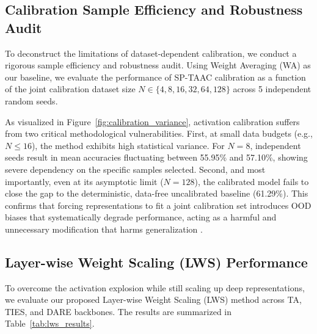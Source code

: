 \documentclass{article}
\theoremstyle{plain}
\theoremstyle{definition}
\theoremstyle{remark}
\begin{document}
\subsection{Calibration Sample Efficiency and Robustness Audit}
To deconstruct the limitations of dataset-dependent calibration, we conduct a rigorous sample efficiency and robustness audit. Using Weight Averaging (WA) as our baseline, we evaluate the performance of SP-TAAC calibration as a function of the joint calibration dataset size $N \in \{4, 8, 16, 32, 64, 128\}$ across 5 independent random seeds.

As visualized in Figure~\ref{fig:calibration_variance}, activation calibration suffers from two critical methodological vulnerabilities. First, at small data budgets (e.g., $N \le 16$), the method exhibits high statistical variance. For $N=8$, independent seeds result in mean accuracies fluctuating between 55.95\% and 57.10\%, showing severe dependency on the specific samples selected. Second, and most importantly, even at its asymptotic limit ($N=128$), the calibrated model fails to close the gap to the deterministic, data-free uncalibrated baseline (61.29\%). This confirms that forcing representations to fit a joint calibration set introduces OOD biases that systematically degrade performance, acting as a harmful and unnecessary modification that harms generalization \cite{overfitting, generalization}.

\subsection{Layer-wise Weight Scaling (LWS) Performance}
To overcome the activation explosion while still scaling up deep representations, we evaluate our proposed Layer-wise Weight Scaling (LWS) method across TA, TIES, and DARE backbones. The results are summarized in Table~\ref{tab:lws_results}.
\end{document}
